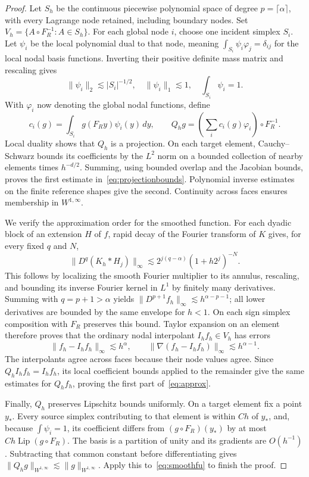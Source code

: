 \documentclass[11pt]{article}
\theoremstyle{remark}
\newcommand{\Lip}{\operatorname{Lip}}
\newcommand{\norm}[1]{\lVert #1\rVert}
\newcommand{\abs}[1]{\lvert #1\rvert}
\begin{document}
\begin{proof}
Let $S_h$ be the continuous piecewise polynomial space of degree $p=\lceil\alpha\rceil$, with every Lagrange node retained, including boundary nodes. Set
$V_h=\{A\circ F_R^{-1}:A\in S_h\}$.
For each global node $i$, choose one incident simplex $S_i$. Let $\psi_i$ be the local polynomial dual to that node, meaning
$\int_{S_i}\psi_i\varphi_j=\delta_{ij}$ for the local nodal basis functions. Inverting their positive definite mass matrix and rescaling gives
\[
 \norm{\psi_i}_2\lesssim\abs{S_i}^{-1/2},\quad
 \norm{\psi_i}_1\lesssim1,\quad \int_{S_i}\psi_i=1.
\]
With $\varphi_i$ now denoting the global nodal functions, define
\[
 c_i(g)=\int_{S_i}g(F_Ry)\psi_i(y)\,dy,
 \qquad Q_hg=\left(\sum_i c_i(g)\varphi_i\right)\circ F_R^{-1}.
\]
Local duality shows that $Q_h$ is a projection. On each target element, Cauchy--Schwarz bounds its coefficients by the $L^2$ norm on a bounded collection of nearby elements times $h^{-d/2}$. Summing, using bounded overlap and the Jacobian bounds, proves the first estimate in~\eqref{eq:projectionbounds}. Polynomial inverse estimates on the finite reference shapes give the second. Continuity across faces ensures membership in $W^{1,\infty}$.

We verify the approximation order for the smoothed function. For each dyadic block of an extension $H$ of $f$, rapid decay of the Fourier transform of $K$ gives, for every fixed $q$ and $N$,
\[
 \norm{D^q(K_h*H_j)}_\infty
 \lesssim 2^{j(q-\alpha)}(1+h2^j)^{-N}.
\]
This follows by localizing the smooth Fourier multiplier to its annulus, rescaling, and bounding its inverse Fourier kernel in $L^1$ by finitely many derivatives. Summing with $q=p+1>\alpha$ yields
$\norm{D^{p+1}f_h}_\infty\lesssim h^{\alpha-p-1}$; all lower derivatives are bounded by the same envelope for $h<1$. On each sign simplex composition with $F_R$ preserves this bound. Taylor expansion on an element therefore proves that the ordinary nodal interpolant $I_hf_h\in V_h$ has errors
\[
 \norm{f_h-I_hf_h}_\infty\lesssim h^\alpha,
 \qquad \norm{\nabla(f_h-I_hf_h)}_\infty\lesssim h^{\alpha-1}.
\]
The interpolants agree across faces because their node values agree. Since $Q_hI_hf_h=I_hf_h$, its local coefficient bounds applied to the remainder give the same estimates for $Q_hf_h$, proving the first part of~\eqref{eq:approx}.

Finally, $Q_h$ preserves Lipschitz bounds uniformly. On a target element fix a point $y_*$. Every source simplex contributing to that element is within $Ch$ of $y_*$, and, because $\int\psi_i=1$, its coefficient differs from $(g\circ F_R)(y_*)$ by at most $Ch\Lip(g\circ F_R)$. The basis is a partition of unity and its gradients are $O(h^{-1})$. Subtracting that common constant before differentiating gives
$\norm{Q_hg}_{W^{1,\infty}}\lesssim\norm g_{W^{1,\infty}}$.
Apply this to~\eqref{eq:smoothfu} to finish the proof.
\end{proof}
\end{document}
